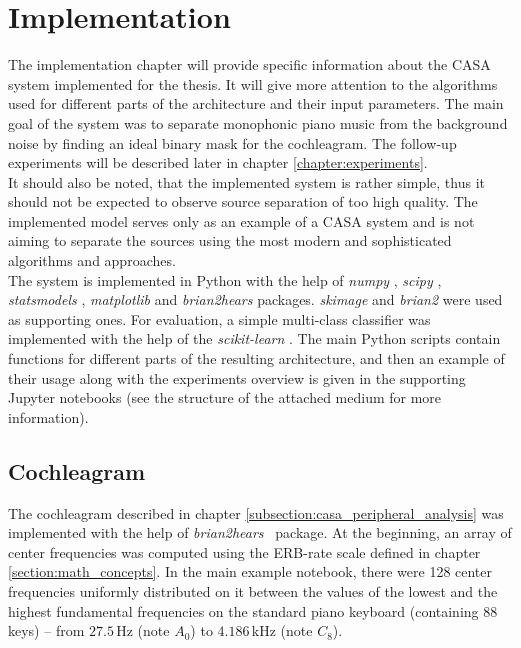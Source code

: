 \chapter{Implementation}\label{chapter:implementation}

The implementation chapter will provide specific information about the CASA system implemented for the thesis. It will give more attention to the algorithms used for different parts of the architecture and their input parameters. The main goal of the system was to separate monophonic piano music from the background noise by finding an ideal binary mask for the cochleagram. The follow-up experiments will be described later in chapter \ref{chapter:experiments}.\\

It should also be noted, that the implemented system is rather simple, thus it should not be expected to observe source separation of too high quality. The implemented model serves only as an example of a CASA system and is not aiming to separate the sources using the most modern and sophisticated algorithms and approaches.\\

The system is implemented in Python with the help of \textit{numpy} \cite{numpy}, \textit{scipy} \cite{scipy}, \textit{statsmodels} \cite{statsmodels}, \textit{matplotlib} \cite{matplotlib} and \textit{brian2hears} \cite{brian2hears} packages. \textit{skimage} \cite{scikit-image} and \textit{brian2} \cite{brian2} were used as supporting ones. For evaluation, a simple multi-class classifier was implemented with the help of the \textit{scikit-learn} \cite{scikit-learn}. The main Python scripts contain functions for different parts of the resulting architecture, and then an example of their usage along with the experiments overview is given in the supporting Jupyter notebooks (see the structure of the attached medium for more information).

\section{Cochleagram}

The cochleagram described in chapter \ref{subsection:casa_peripheral_analysis} was implemented with the help of \textit{brian2hears}~\cite{brian2hears} package. At the beginning, an array of center frequencies was computed using the ERB-rate scale defined in chapter \ref{section:math_concepts}. In the main example notebook, there were 128 center frequencies uniformly distributed on it between the values of the lowest and the highest fundamental frequencies on the standard piano keyboard (containing 88 keys) -- from $27.5$\,Hz (note $A_0$) to $4.186$\,kHz (note $C_8$).\\

